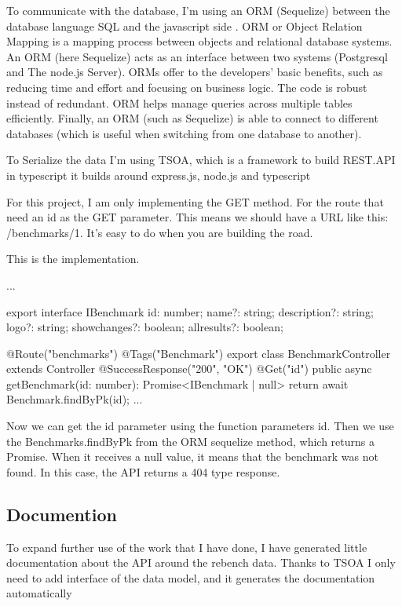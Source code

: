 \documentclass{article}
\begin{document}
To communicate with the database, I'm using an ORM (Sequelize) between the database language SQL and the javascript side \cite{pereira2016working}. ORM or Object Relation Mapping is a mapping process between objects and relational database systems. An ORM (here Sequelize) acts as an interface between two systems (Postgresql and The node.js Server). ORMs offer to the developers' basic benefits, such as reducing time and effort and focusing on business logic. The code is robust instead of redundant. ORM helps manage queries across multiple tables efficiently. Finally, an ORM (such as Sequelize) is able to connect to different databases (which is useful when switching from one database to another).



To Serialize the data I'm using TSOA, which is a framework to build REST.API in typescript it builds around express.js, node.js and typescript

For this project, I am only implementing the GET method. For the route that need an id as the GET parameter. This means we should have a URL like this: /benchmarks/1. It's easy to do when you are building the road.

This is the implementation.

\begin{python}
...

export interface IBenchmark {
  id: number;
  name?: string;
  description?: string;
  logo?: string;
  showchanges?: boolean;
  allresults?: boolean;
}

@Route("benchmarks")
@Tags("Benchmark")
export class BenchmarkController extends Controller {
  @SuccessResponse("200", "OK")
  @Get("{id}")
  public async getBenchmark(id: number): Promise<IBenchmark | null> {
    return await Benchmark.findByPk(id);
  }
  ...
}
\end{python}

Now we can get the id parameter using the function parameters id. Then we use the Benchmarks.findByPk from the ORM sequelize method, which returns a Promise. When it receives a null value, it means that the benchmark was not found. In this case, the API returns a 404 type response.

\subsection{Documention}

To expand further use of the work that I have done, I have generated little documentation about the API around the rebench data.
Thanks to TSOA I only need to add interface of the data model, and it generates the documentation automatically
\end{document}
